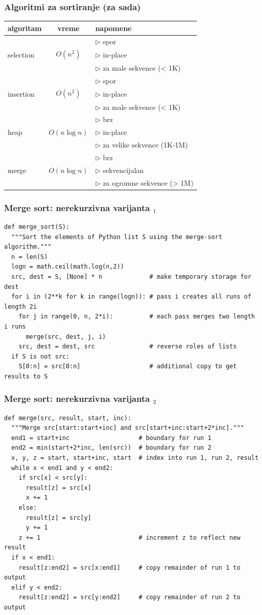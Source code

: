 \documentclass[compress]{beamer}
\begin{document}
\begin{frame}[fragile]
  \frametitle{Algoritmi za sortiranje (za sada)}
  \begin{tabular}{l|c|p{6cm}}
  \textbf{algoritam} & \textbf{vreme} & \textbf{napomene} \\ \hline\hline
   &  & $\rhd$ spor \\ 
  selection & $O(n^2)$ & $\rhd$ in-place \\ 
   &  & $\rhd$ za male sekvence (< 1K) \\ \hline
   &  & $\rhd$ spor \\ 
  insertion & $O(n^2)$ & $\rhd$ in-place \\ 
   &  & $\rhd$ za male sekvence (< 1K) \\ \hline
   &  & $\rhd$ brz \\
  heap & $O(n\log n)$ & $\rhd$ in-place \\
   &  & $\rhd$ za velike sekvence (1K-1M) \\ \hline
   &  & $\rhd$ brz \\
  merge & $O(n\log n)$ & $\rhd$ sekvencijalan \\
   &  & $\rhd$ za ogromne sekvence (> 1M) \\ \hline
  \end{tabular}
\end{frame}

\begin{frame}[fragile,shrink=25]
  \frametitle{Merge sort: nerekurzivna varijanta $_1$}
\begin{verbatim}
def merge_sort(S):
  """Sort the elements of Python list S using the merge-sort algorithm."""
  n = len(S)
  logn = math.ceil(math.log(n,2))
  src, dest = S, [None] * n             # make temporary storage for dest
  for i in (2**k for k in range(logn)): # pass i creates all runs of length 2i
    for j in range(0, n, 2*i):          # each pass merges two length i runs
      merge(src, dest, j, i)
    src, dest = dest, src               # reverse roles of lists
  if S is not src:
    S[0:n] = src[0:n]                   # additional copy to get results to S
\end{verbatim}
\end{frame}

\begin{frame}[fragile,shrink=25]
  \frametitle{Merge sort: nerekurzivna varijanta $_2$}
\begin{verbatim}
def merge(src, result, start, inc):
  """Merge src[start:start+inc] and src[start+inc:start+2*inc]."""
  end1 = start+inc                   # boundary for run 1
  end2 = min(start+2*inc, len(src))  # boundary for run 2
  x, y, z = start, start+inc, start  # index into run 1, run 2, result
  while x < end1 and y < end2:
    if src[x] < src[y]:
      result[z] = src[x]
      x += 1
    else:
      result[z] = src[y]
      y += 1
    z += 1                           # increment z to reflect new result
  if x < end1:
    result[z:end2] = src[x:end1]     # copy remainder of run 1 to output
  elif y < end2:
    result[z:end2] = src[y:end2]     # copy remainder of run 2 to output
\end{verbatim}
\end{frame}
\end{document}
